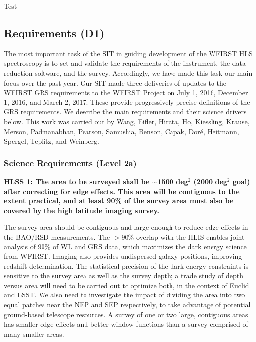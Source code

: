 


\begin{tcolorbox}[width=\textwidth,colback={coralpink},outer arc=0mm,colupper=white]
     Test
\end{tcolorbox}



 \subsection{Requirements (D1)}

 The most important task of the SIT in guiding development of the WFIRST HLS
 spectroscopy is to set and validate the requirements of the instrument, the data
 reduction software, and the survey.  Accordingly, we have made this task our main focus
 over the past year. Our SIT made three deliveries of updates to
 the WFIRST GRS requirements to the WFIRST Project on July 1, 2016, December 1,
 2016, and March 2, 2017. These provide progressively precise definitions of the
 GRS requirements. We describe the main requirements and their science drivers
 below. This work was carried out by Wang, Eifler, Hirata, Ho, Kiessling, Krause, Merson, Padmanabhan, Pearson, Samushia,
 Benson, Capak, Dor\'e, Heitmann, Spergel, Teplitz, and Weinberg.

 \subsubsection{Science Requirements (Level 2a)}

 \noindent
 {\bf HLSS 1: The area to be surveyed shall be $\sim$1500 deg$^2$ (2000 deg$^2$ goal) after
 correcting for edge effects.  This area will be contiguous to the extent
 practical, and at least 90\% of the survey area must also be covered by the high
 latitude imaging survey. }

 The survey area should be contiguous and large enough to reduce edge effects in
 the BAO/RSD measurements.  The $>90\%$ overlap with the HLIS enables joint
 analysis of 90\% of WL and GRS data, which maximizes the dark energy science
 from WFIRST.  Imaging also provides undispersed galaxy positions, improving
 redshift determination.  The statistical precision of the dark energy
 constraints is sensitive to the survey area as well as the survey depth; a trade
 study of depth versus area will need to be carried out to optimize both, in the
 context of Euclid and LSST. We also need to investigate the impact of dividing
 the area into two equal patches near the NEP and SEP respectively, to take
 advantage of potential ground-based telescope resources.  A survey of one or
 two large, contiguous areas has smaller edge effects and better window functions
 than a survey comprised of many smaller areas.

